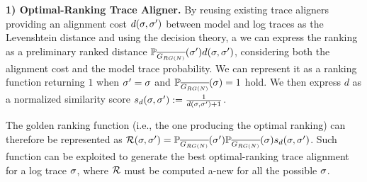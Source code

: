 {%

\noindent
\textbf{1) Optimal-Ranking Trace Aligner.}\label{subsec:eta}
By reusing existing trace aligners  \cite{DBLP:conf/edoc/AdriansyahDA11,LeoniM17} providing an alignment cost  $d(\sigma,{\sigma'})$ between model and log traces as the Levenshtein distance and
using the decision theory, a we can express the ranking as a preliminary ranked distance $\mathbb{P}_{\overline{G_{RG(N)}}}({\sigma'}) d(\sigma,{\sigma'})$, considering both the alignment cost and the model trace probability.
%
We can represent it 
as a ranking function %
returning $1$ when ${\sigma'}=\sigma$ and $\mathbb{P}_{\overline{G_{RG(N)}}}(\sigma)=1$ hold. We then express $d$ as
a normalized similarity score $s_d(\sigma,{\sigma'}):=\frac{1}{d(\sigma,{\sigma'})+1}$. %
{The golden ranking function (i.e., the one producing the optimal ranking) can therefore be represented as $\mathcal{R}(\sigma,{\sigma'})=\mathbb{P}_{\overline{G_{RG(N)}}}({\sigma'}) \mathbb{P}_{\overline{G_{RG(N)}}}(\sigma) s_d(\sigma,{\sigma'})$. Such function can be exploited to generate the best optimal-ranking trace alignment for a log trace $\sigma$, where $\mathcal{R}$ must be computed a-new for all the possible $\sigma$.
	
}}
